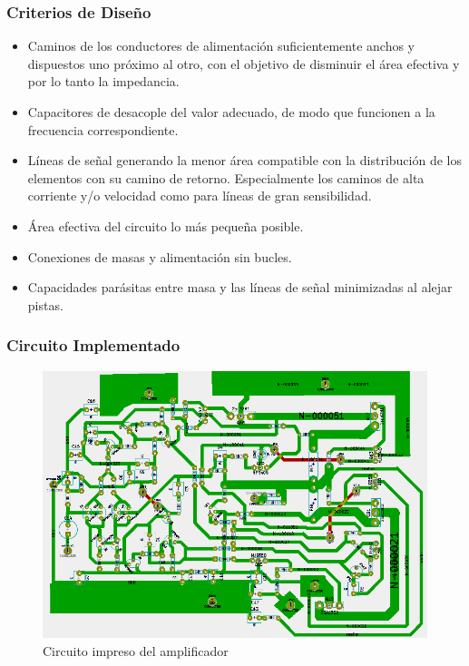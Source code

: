 \subsubsection{Criterios de Diseño}

\begin{itemize}
\bigskip 

\item  Caminos de los conductores de alimentación suficientemente anchos y  dispuestos uno próximo al otro, con el objetivo de disminuir el área efectiva y por lo tanto la impedancia.

\item Capacitores de desacople del valor adecuado, de modo que funcionen a la frecuencia correspondiente.

\item Líneas de señal generando la menor área compatible con la distribución de los elementos con su camino de retorno. Especialmente los caminos de alta corriente y/o velocidad como para líneas de gran sensibilidad.

\item Área efectiva del circuito lo más pequeña posible.

\item Conexiones de masas y alimentación sin bucles.

\item Capacidades parásitas entre masa y las líneas de señal minimizadas al alejar pistas.
\end{itemize}

\subsubsection{Circuito Implementado}
\begin{figure}[hbtp]
\centerline{
\includegraphics[scale=0.55]{img/circuito_implementado_todo.png}}
\caption{Circuito impreso del amplificador}
\end{figure}

